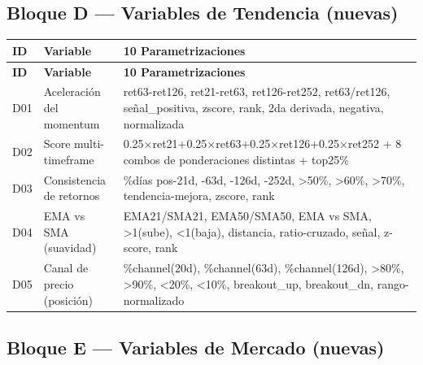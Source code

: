\documentclass[12pt,letterpaper]{article}
\begin{document}
\subsection{Bloque D — Variables de Tendencia (nuevas)}

\begin{longtable}{p{0.8cm} p{4.5cm} p{9cm}}
\toprule
\textbf{ID} & \textbf{Variable} & \textbf{10 Parametrizaciones} \\
\midrule
\endfirsthead
\toprule \textbf{ID} & \textbf{Variable} & \textbf{10 Parametrizaciones} \\ \midrule
\endhead \bottomrule \endfoot
D01 & Aceleración del momentum & ret63-ret126, ret21-ret63, ret126-ret252, ret63/ret126, señal\_positiva, zscore, rank, 2da derivada, negativa, normalizada \\[3pt]
D02 & Score multi-timeframe & 0.25×ret21+0.25×ret63+0.25×ret126+0.25×ret252 + 8 combos de ponderaciones distintas + top25\% \\[3pt]
D03 & Consistencia de retornos & \%días pos-21d, -63d, -126d, -252d, >50\%, >60\%, >70\%, tendencia-mejora, zscore, rank \\[3pt]
D04 & EMA vs SMA (suavidad) & EMA21/SMA21, EMA50/SMA50, EMA vs SMA, >1(sube), <1(baja), distancia, ratio-cruzado, señal, z-score, rank \\[3pt]
D05 & Canal de precio (posición) & \%channel(20d), \%channel(63d), \%channel(126d), >80\%, >90\%, <20\%, <10\%, breakout\_up, breakout\_dn, rango-normalizado \\
\end{longtable}

\subsection{Bloque E — Variables de Mercado (nuevas)}
\end{document}
